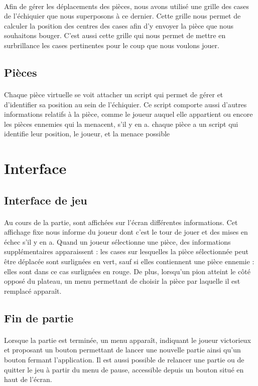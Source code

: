 \documentclass{article}
\begin{document}
\paragraph{}Afin de gérer les déplacements des pièces, nous avons utilisé une grille des cases de l'échiquier que nous superposons à ce dernier. Cette grille nous permet de calculer la position des centres des cases afin d'y envoyer la pièce que nous souhaitons bouger. C'est aussi cette grille qui nous permet de mettre en surbrillance les cases pertinentes pour le coup que nous voulons jouer.
\subsection{Pièces}
\paragraph{}Chaque pièce virtuelle se voit attacher un script qui permet de gérer et d'identifier sa position au sein de l'échiquier. Ce script comporte aussi d'autres informations relatifs à la pièce, comme le joueur auquel elle appartient ou encore les pièces ennemies qui la menacent, s'il y en a.
chaque pièce a un script qui identifie leur position, le joueur, et la menace possible
\section{Interface}
\subsection{Interface de jeu}
\paragraph{}Au cours de la partie, sont affichées sur l'écran différentes informations. Cet affichage fixe nous informe du joueur dont c'est le tour de jouer et des mises en échec s'il y en a. Quand un joueur sélectionne une pièce, des informations supplémentaires apparaissent : les cases sur lesquelles la pièce sélectionnée peut être déplacée sont surlignées en vert, sauf si elles contiennent une pièce ennemie : elles sont dans ce cas surlignées en rouge. De plus, lorsqu'un pion atteint le côté opposé du plateau, un menu permettant de choisir la pièce par laquelle il est remplacé apparaît.
\subsection{Fin de partie}
\paragraph{}Lorsque la partie est terminée, un menu apparaît, indiquant le joueur victorieux et proposant un bouton permettant de lancer une nouvelle partie ainsi qu'un bouton fermant l'application. Il est aussi possible de relancer une partie ou de quitter le jeu à partir du menu de pause, accessible depuis un bouton situé en haut de l'écran.
\end{document}
